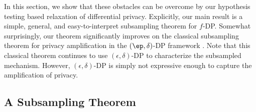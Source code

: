 In this section, we show that these obstacles can be overcome by our hypothesis testing based relaxation of differential privacy. Explicitly, our main result is a simple, general, and easy-to-interpret subsampling theorem for $f$-DP. Somewhat surprisingly, our theorem significantly improves on the classical subsampling theorem for privacy amplification in the $(\ep,\delta)$-DP framework \cite{jon}. Note that this classical theorem continues to use $(\epsilon,\delta)$-DP to characterize the subsampled mechanism. However, $(\epsilon,\delta)$-DP is simply not expressive enough to capture the amplification of privacy.




\subsection{A Subsampling Theorem} %
\label{sec:subsample_theorems}


